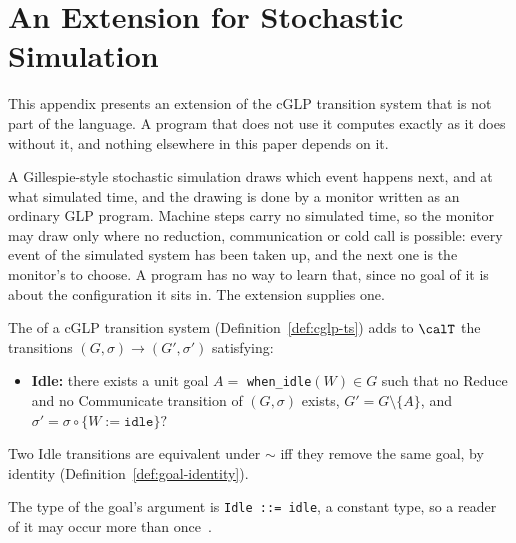 \section{An Extension for Stochastic Simulation}\label{appendix:idle}

This appendix presents an extension of the cGLP transition system that is not part of the language.  A program that does not use it computes exactly as it does without it, and nothing elsewhere in this paper depends on it.

A Gillespie-style stochastic simulation draws which event happens next, and at what simulated time, and the drawing is done by a monitor written as an ordinary GLP program.  Machine steps carry no simulated time, so the monitor may draw only where no reduction, communication or cold call is possible: every event of the simulated system has been taken up, and the next one is the monitor's to choose.  A program has no way to learn that, since no goal of it is about the configuration it sits in.  The extension supplies one.

\begin{definition}
\label{def:idle-transition}
The  of a cGLP transition system (Definition~\ref{def:cglp-ts}) adds to $\calT$ the transitions $(G, \sigma) \rightarrow (G', \sigma')$ satisfying:
\begin{itemize}
    \item \textbf{Idle:} there exists a unit goal $A = $ \verb|when_idle|$(W) \in G$ such that no Reduce and no Communicate transition of $(G, \sigma)$ exists, $G' = G \setminus \{A\}$, and $\sigma' = \sigma \circ \{W := \mathtt{idle}\}?$
\end{itemize}
Two Idle transitions are equivalent under ${\sim}$ iff they remove the same goal, by identity (Definition~\ref{def:goal-identity}).
\end{definition}

The type of the goal's argument is \verb|Idle ::= idle|, a constant type, so a reader of it may occur more than once~\cite{shapiro2026types}.

